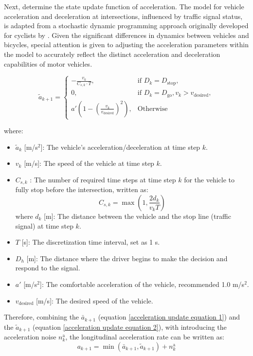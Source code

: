 Next, determine the state update function of acceleration.
The model for vehicle acceleration and deceleration at intersections, influenced by traffic signal status, is adapted from a stochastic dynamic programming approach originally developed for cyclists by \textcite{dabiri2020optimized}. Given the significant differences in dynamics between vehicles and bicycles, special attention is given to adjusting the acceleration parameters within the model to accurately reflect the distinct acceleration and deceleration capabilities of motor vehicles. 


\begin{equation}\label{acceleration update equation 2}
     \tilde a_{k+1} = 
\begin{cases} 
-\frac{v_k}{C_{s,k} \cdot T}, & \text{if } D_k = D_{\text{stop}}, \\
0, & \text{if } D_k = D_{\text{go}}, v_k > v_{\text{desired}}, \\
a' \left(1 - \left(\frac{v_k}{v_{\text{desired}}}\right)^2\right), & \text{Otherwise}
\end{cases}
\end{equation}


where:
\begin{itemize}
    \item \(\tilde a_k\) [m/s$^2$]: The vehicle's acceleration/deceleration at time step \(k\).
    \item \(v_k\) [m/s]: The speed of the vehicle at time step \(k\).
    \item \(C_{s,k}\) : The number of required time steps at time step \(k\) for the vehicle to fully stop before the intersection, written as:
    \begin{equation}
        C_{s,k} = \max \left(1, \frac{2d_k}{v_k T}\right)
    \end{equation}
    where \(d_k\) [m]: The distance between the vehicle and the stop line (traffic signal) at time step \(k\).
    \item \(T\) [s]: The discretization time interval, set as 1 s.
    \item \(D_h\) [m]: The distance where the driver begins to make the decision and respond to the signal.
    \item \(a'\) [m/s$^2$]: The comfortable acceleration of the vehicle, recommended 1.0 m/s$^2$.
    \item \(v_{\text{desired}}\) [m/s]: The desired speed of the vehicle.
\end{itemize}
Therefore, combining the $\bar a_{k+1}$ (equation \ref{acceleration update equation 1}) and the $\tilde a_{k+1}$ (equation \ref{acceleration update equation 2}), with introducing the acceleration noise $n_k^\text{a}$, the longitudinal acceleration rate can be written as:
\begin{equation}
    a_{k+1} = \min \left(\bar a_{k+1}, \tilde a_{k+1}\right) + n_k^\text{a}
\end{equation}


